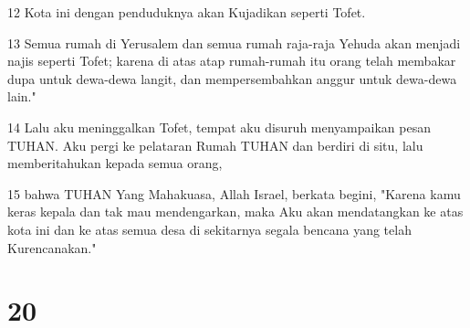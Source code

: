 \par 12 Kota ini dengan penduduknya akan Kujadikan seperti Tofet.
\par 13 Semua rumah di Yerusalem dan semua rumah raja-raja Yehuda akan menjadi najis seperti Tofet; karena di atas atap rumah-rumah itu orang telah membakar dupa untuk dewa-dewa langit, dan mempersembahkan anggur untuk dewa-dewa lain."
\par 14 Lalu aku meninggalkan Tofet, tempat aku disuruh menyampaikan pesan TUHAN. Aku pergi ke pelataran Rumah TUHAN dan berdiri di situ, lalu memberitahukan kepada semua orang,
\par 15 bahwa TUHAN Yang Mahakuasa, Allah Israel, berkata begini, "Karena kamu keras kepala dan tak mau mendengarkan, maka Aku akan mendatangkan ke atas kota ini dan ke atas semua desa di sekitarnya segala bencana yang telah Kurencanakan."

\chapter{20}

